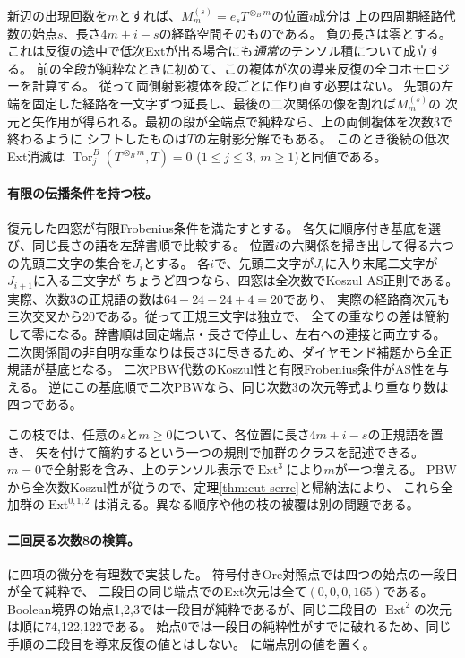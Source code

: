 新辺の出現回数を$m$とすれば、$M_m^{(s)}=e_s T^{\otimes_B m}$の位置$i$成分は
上の四周期経路代数の始点$s$、長さ$4m+i-s$の経路空間そのものである。
負の長さは零とする。これは反復の途中で低次Extが出る場合にも\emph{通常の}テンソル積について成立する。
前の全段が純粋なときに初めて、この複体が次の導来反復の全コホモロジーを計算する。
従って両側射影複体を段ごとに作り直す必要はない。
先頭の左端を固定した経路を一文字ずつ延長し、最後の二次関係の像を割れば$M_m^{(s)}$の
次元と矢作用が得られる。最初の段が全端点で純粋なら、上の両側複体を次数3で終わるように
シフトしたものは$T$の左射影分解でもある。
このとき後続の低次Ext消滅は
$\operatorname{Tor}_{j}^{B}(T^{\otimes_B m},T)=0$ ($1\le j\le3$, $m\ge1$)と同値である。

\paragraph{有限の伝播条件を持つ枝。}
復元した四窓が有限Frobenius条件を満たすとする。
各矢に順序付き基底を選び、同じ長さの語を左辞書順で比較する。
位置$i$の六関係を掃き出して得る六つの先頭二文字の集合を$J_i$とする。
各$i$で、先頭二文字が$J_i$に入り末尾二文字が$J_{i+1}$に入る三文字が
ちょうど四つなら、四窓は全次数でKoszul AS正則である。
実際、次数3の正規語の数は$64-24-24+4=20$であり、
実際の経路商次元も三次交叉から20である。従って正規三文字は独立で、
全ての重なりの差は簡約して零になる。辞書順は固定端点・長さで停止し、左右への連接と両立する。
二次関係間の非自明な重なりは長さ3に尽きるため、ダイヤモンド補題から全正規語が基底となる。
二次PBW代数のKoszul性と有限Frobenius条件がAS性を与える。
逆にこの基底順で二次PBWなら、同じ次数3の次元等式より重なり数は四つである。

この枝では、任意の$s$と$m\ge0$について、各位置に長さ$4m+i-s$の正規語を置き、
矢を付けて簡約するという一つの規則で加群のクラスを記述できる。
$m=0$で全射影を含み、上のテンソル表示で$\operatorname{Ext}^3$により$m$が一つ増える。
PBWから全次数Koszul性が従うので、定理\ref{thm:cut-serre}と帰納法により、
これら全加群の$\operatorname{Ext}^{0,1,2}$は消える。異なる順序や他の枝の被覆は別の問題である。

\paragraph{二回戻る次数8の検算。}
に四項の微分を有理数で実装した。
符号付きOre対照点では四つの始点の一段目が全て純粋で、
二段目の同じ端点でのExt次元は全て$(0,0,0,165)$である。
Boolean境界の始点1,2,3では一段目が純粋であるが、同じ二段目の
$\operatorname{Ext}^2$の次元は順に74,122,122である。
始点0では一段目の純粋性がすでに破れるため、同じ手順の二段目を導来反復の値とはしない。
に端点別の値を置く。
